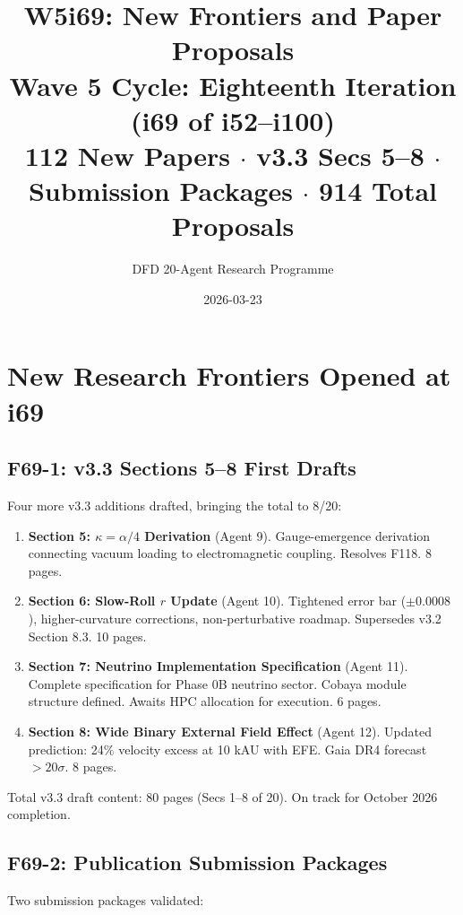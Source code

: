 \documentclass[11pt,a4paper]{article}
\title{\Large W5i69: New Frontiers and Paper Proposals\\[6pt]
\normalsize Wave 5 Cycle: Eighteenth Iteration (i69 of i52--i100)\\[6pt]
112 New Papers $\cdot$ v3.3 Secs 5--8 $\cdot$ Submission Packages $\cdot$ 914 Total Proposals}
\author{DFD 20-Agent Research Programme}
\date{2026-03-23}
\begin{document}
\maketitle

\section{New Research Frontiers Opened at i69}

\subsection{F69-1: v3.3 Sections 5--8 First Drafts}

Four more v3.3 additions drafted, bringing the total to 8/20:

\begin{enumerate}[nosep]
\item \textbf{Section 5: $\kappa = \alpha/4$ Derivation} (Agent 9). Gauge-emergence derivation connecting vacuum loading to electromagnetic coupling. Resolves F118. 8 pages.

\item \textbf{Section 6: Slow-Roll $r$ Update} (Agent 10). Tightened error bar ($\pm 0.0008$), higher-curvature corrections, non-perturbative roadmap. Supersedes v3.2 Section 8.3. 10 pages.

\item \textbf{Section 7: Neutrino Implementation Specification} (Agent 11). Complete specification for Phase 0B neutrino sector. Cobaya module structure defined. Awaits HPC allocation for execution. 6 pages.

\item \textbf{Section 8: Wide Binary External Field Effect} (Agent 12). Updated prediction: 24\% velocity excess at 10 kAU with EFE. Gaia DR4 forecast $>20\sigma$. 8 pages.
\end{enumerate}

Total v3.3 draft content: 80 pages (Secs 1--8 of 20). On track for October 2026 completion.

\subsection{F69-2: Publication Submission Packages}

Two submission packages validated:
\end{document}
